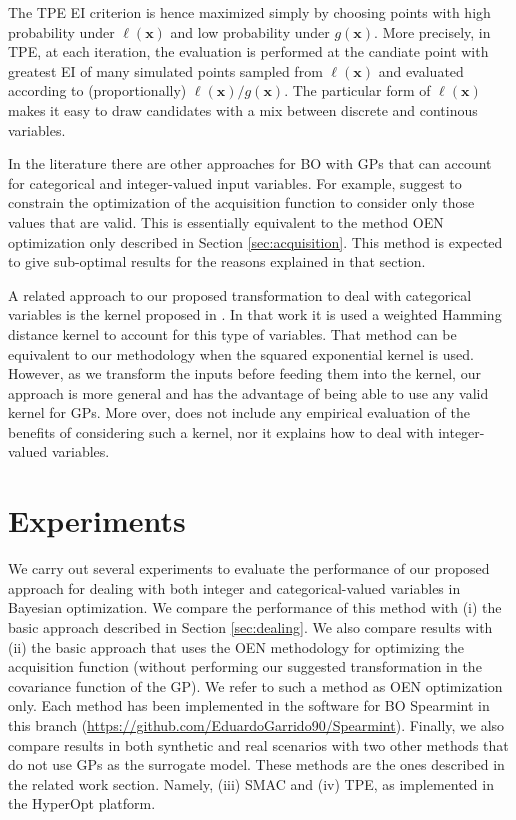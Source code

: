 The TPE EI criterion is hence maximized simply by choosing points with high probability
under $\ell(\mathbf{x})$ and low probability under $g(\mathbf{x})$.
More precisely, in TPE, at each iteration, the evaluation is performed at the candiate point with greatest EI of many
simulated points sampled from $\ell(\mathbf{x})$ and evaluated according to (proportionally) $\ell(\mathbf{x}) / g(\mathbf{x})$.
The particular form of $\ell(\mathbf{x})$ makes it easy to draw candidates with a mix between discrete and continous variables.

In the literature there are other approaches for BO with GPs that can account for categorical and
integer-valued input variables. For example, \cite{rainforth2016bayesian,levesque2017bayesian} suggest to
constrain the optimization of the acquisition function to consider only those values that are valid. This is
essentially equivalent to the method OEN optimization only described in Section \ref{sec:acquisition}. This method
is expected to give sub-optimal results for the reasons explained in that section.

A related approach to our proposed transformation to deal with categorical variables is the kernel proposed
in \citep{hutter2009automated}. In that work it is used a weighted Hamming distance kernel to account for
this type of variables. That method can be equivalent to our methodology when the squared exponential kernel is used.
However, as we transform the inputs before feeding them into the kernel, our approach is more general and has the
advantage of being able to use any valid kernel for GPs. More over, \cite{hutter2009automated} does not include any
empirical evaluation of the benefits of considering such a kernel, nor it explains how to deal with integer-valued variables.

\section{Experiments}
We carry out several experiments to evaluate the performance of our proposed approach for dealing with
both integer and categorical-valued variables in Bayesian optimization. We compare the performance of this
method with (i) the basic approach described in Section \ref{sec:dealing}. We also compare results with (ii) the
basic approach that uses the OEN methodology for optimizing the acquisition function (without performing our
suggested transformation in the covariance function of the GP). We refer to such a method as OEN optimization only.
Each method has been implemented in the software for BO Spearmint in this branch (\url{https://github.com/EduardoGarrido90/Spearmint}).
Finally, we also compare results in both synthetic and real scenarios with two other methods that do not
use GPs as the surrogate model. These methods are the ones described in the related work section. Namely,
(iii) SMAC and (iv) TPE, as implemented in the HyperOpt platform.

